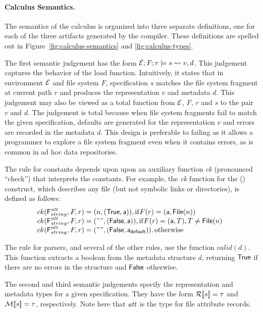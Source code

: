 \paragraph*{Calculus Semantics.}
%
The semantics of the calculus is organized into three separate
definitions, one for each of the three artifacts generated by the
\forest{} compiler. These definitions are spelled out in
Figure~\ref{fig:calculus-semantics} and \ref{fig:calculus-types}.

The first semantic judgement has the form $\mathcal{E};F;r \models s \rightsquigarrow
v,d$.  This judgement captures the behavior of the load function.
Intuitively, it states that in environment $\mathcal{E}$ and file system $F$,
specification $s$ matches the file system fragment at current path $r$
and produces the representation $v$ and metadata $d$.  This judgement
may also be viewed as a total function from $\mathcal{E}$, $F$, $r$ and $s$
to the pair $v$ and $d$.  The judgement is total because when file
system fragments fail to match the given specification, defaults are
generated for the representation $v$ and errors are recorded in the
metadata $d$.  This design is preferable to failing as it allows a
programmer to explore a file system fragment even when it contains
errors, as is common in ad hoc data repositories.

The rule for constants depends upon upon an auxiliary function 
{\it ck} (pronounced ``check'') that interprets the constants.  For
example, the {\it ck} function for the (\pfile) construct, which
describes any file (but not symbolic links or directories), is defined
as follows:
\[
\begin{array}{@{}l}
ck(\mbox{\sf F}^{\metapdty}_{\stringty},F,r) = (n,(\True,\att)), \mathrm{if } F(r) = (\att,\File{n}) \\
ck(\mbox{\sf F}^{\metapdty}_{\stringty},F,r) = ("",(\False,\att)), \mathrm{if } F(r) = (\att,T), T \not=\File{n} \\
ck(\mbox{\sf F}^{\metapdty}_{\stringty},F,r) = ("",(\False,\defaultatt)), \mathrm{otherwise}
\end{array}
\]

The rule for \padshaskell{} parsers, and several of the other rules,
use the function $valid(d)$.  This function extracts a boolean from
the metadata structure $d$, returning $\mathsf{True}$ if there are no errors
in the structure and $\mathsf{False}$ otherwise. 

The second and third semantic judgements specify the representation
and metadata types for a given specification.  They have the form
${\cal R}[\![ s ]\!] = \tau$ and ${\cal M}[\![ s ]\!] = \tau$, respectively.  Note here
that $\mathit{att}$ is the type for file attribute records.

